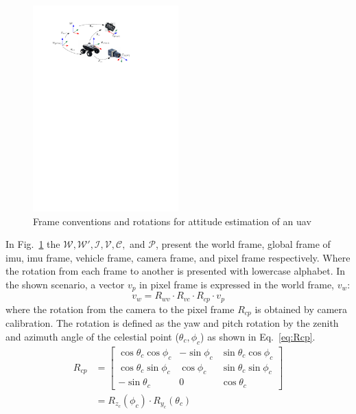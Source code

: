 \begin{figure}[h]
  \centering
  \includegraphics[width=0.5\textwidth]{./content/intro/figures/conventions.pdf}
  \caption{Frame conventions and rotations for attitude estimation of an
    \gls{uav}}
  \label{fig:rotation}
\end{figure}
In Fig.~\ref{fig:rotation} the $\mathcal{W}, \mathcal{W'}, \mathcal{I},
\mathcal{V}, \mathcal{C},$ and $\mathcal{P}$, present the world frame, global
frame of \gls{imu}, \gls{imu} frame, vehicle frame, camera frame, and pixel
frame respectively. Where the rotation from each frame to another is presented
with lowercase alphabet.
In the shown scenario, a vector $v_{p}$ in pixel frame is
expressed in the world frame, $v_{w}$:
\begin{equation}
  \label{eq:vinW}
  v_{w} = R_{wv} \cdot R_{vc} \cdot R_{cp} \cdot v_{p}
\end{equation}
\noindent where the rotation from the camera to the pixel frame $R_{cp}$ is
obtained by camera calibration. The rotation is
defined as the yaw and pitch rotation by the zenith and azimuth angle of the
celestial point ($\theta_c, \phi_c$) as shown in Eq.~\ref{eq:Rcp}.
\begin{equation}
  \label{eq:Rcp}
  \begin{split}
  R_{cp}  & =
  \begin{bmatrix}
    \cos\theta_{c}\cos\phi_{c} & -\sin\phi_{c} & \sin\theta_{c}\cos\phi_{c}\\
    \cos\theta_{c}\sin\phi_{c} & \cos\phi_{c} & \sin\theta_{c}\sin\phi_{c}\\
    -\sin\theta_{c} & 0 & \cos\theta_{c}
  \end{bmatrix}
  \\
  & = R_{z_{c}}(\phi_{c})\cdot R_{y_{c}}(\theta_{c})
  \end{split}
\end{equation}

